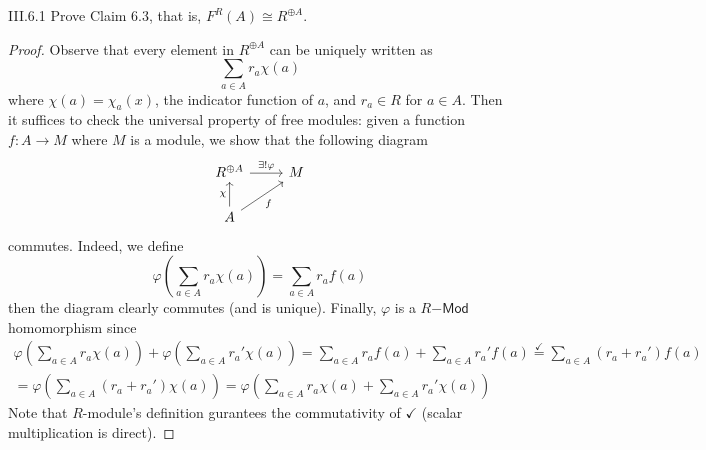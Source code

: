 \begin{problem}{III.6.1}
Prove Claim 6.3, that is, $F^R(A) \cong R^{\oplus A}$.
\end{problem}
\begin{proof}
Observe that every element in $R^{\oplus A}$ can be uniquely written as
\[
\sum_{a \in A}r_a \chi(a)	
\]
where $\chi(a) = \chi_a(x)$, the indicator function of $a$, and $r_a \in R$ for $a \in A$. Then it suffices to check the universal property of free modules: given a function $f : A \to M$ where $M$ is a module, we show that the following diagram 
\[
\begin{tikzcd}
R^{\oplus A} \arrow[r, "\exists!\varphi"] & M \\
A \arrow[u, "\chi"] \arrow[ru, "f"']      &  
\end{tikzcd}
\]
commutes. Indeed, we define
\[
\varphi\left(\sum_{a \in A}r_a \chi(a)\right) = \sum_{a \in A}r_a f(a)
\]
then the diagram clearly commutes (and is unique). Finally, $\varphi$ is a $R\mathsf{-Mod}$ homomorphism since 
\begin{align*}
\varphi\left(\sum_{a \in A}r_a \chi(a)\right) + \varphi\left(\sum_{a \in A}r_a' \chi(a)\right) = \sum_{a \in A}r_a f(a) + \sum_{a \in A}r_a' f(a)\overset{\checkmark}{=} \sum_{a \in A}(r_a+r_a') f(a) \\
= \varphi\left(\sum_{a \in A}(r_a+r_a') \chi(a)\right) = \varphi\left(\sum_{a \in A}r_a \chi(a) + \sum_{a \in A}r_a' \chi(a)\right)	
\end{align*}
Note that $R$-module's definition gurantees the commutativity of $\checkmark$ (scalar multiplication is direct).
\end{proof}

